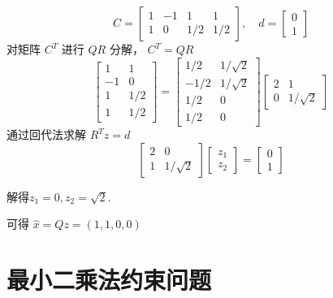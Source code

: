 \begin{example}
    \begin{equation}
C=\left[\begin{array}{cccc}
1 & -1 & 1 & 1 \\
1 & 0 & 1 / 2 & 1 / 2
\end{array}\right], \quad d=\left[\begin{array}{l}
0 \\
1
\end{array}\right]
\end{equation}
对矩阵 $ C^{T} $ 进行 $ Q R $ 分解， $ C^{T}=Q R $
\begin{equation}
\left[\begin{array}{cc}
1 & 1 \\
-1 & 0 \\
1 & 1 / 2 \\
1 & 1 / 2
\end{array}\right]=\left[\begin{array}{cc}
1 / 2 & 1 / \sqrt{2} \\
-1 / 2 & 1 / \sqrt{2} \\
1 / 2 & 0 \\
1 / 2 & 0
\end{array}\right]\left[\begin{array}{cc}
2 & 1 \\
0 & 1 / \sqrt{2}
\end{array}\right]
\end{equation}
通过回代法求解 $ R^{T} z=d $
\begin{equation}
\left[\begin{array}{cc}
2 & 0 \\
1 & 1 / \sqrt{2}
\end{array}\right]\left[\begin{array}{l}
z_{1} \\
z_{2}
\end{array}\right]=\left[\begin{array}{l}
0 \\
1
\end{array}\right]
\end{equation}

解得$
 z_{1}=0, z_{2}=\sqrt{2}
$.

可得 $ \hat{x}=Q z=(1,1,0,0) $
\end{example}

\section{最小二乘法约束问题}

